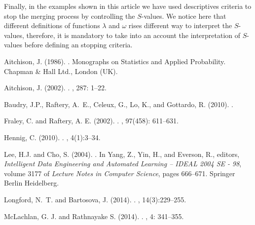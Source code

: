 \documentclass[10pt, a4paper]{article}
\begin{document}
\begin{spacing}{1.9}
Finally, in the examples shown in this article we have used descriptives criteria to stop the merging process by controlling the $S$-values. We notice here that different definitions of functions $\lambda$ and $\omega$ rises different way to interpret the $S$-values, therefore, it is mandatory to take into an account the interpretation of $S$-values before defining an stopping criteria.


\newpage


\begin{thebibliography}{}

Aitchison, J. (1986).
.
\newblock Monographs on Statistics and Applied Probability. Chapman \& Hall
  Ltd., London (UK).

Aitchison, J. (2002).
.
, 287: 1--22.

Baudry, J.P., Raftery, A.~E., Celeux, G., Lo, K., and Gottardo, R. (2010).
.

Fraley, C. and Raftery, A. E. (2002).
.
, 97(458): 611–631.

Hennig, C. (2010).
.
, 4(1):3--34.

Lee, H.J. and Cho, S. (2004).
.
\newblock In Yang, Z., Yin, H., and Everson, R., editors, {\em Intelligent Data
  Engineering and Automated Learning – IDEAL 2004 SE - 98}, volume 3177 of
  {\em Lecture Notes in Computer Science}, pages 666--671. Springer Berlin
  Heidelberg.

Longford, N.~T. and Bartosova, J. (2014).
.
, 14(3):229--255.


McLachlan, G. J. and Rathnayake S. (2014).
.
,  4: 341–355.


\end{thebibliography}
\end{spacing}
\end{document}
